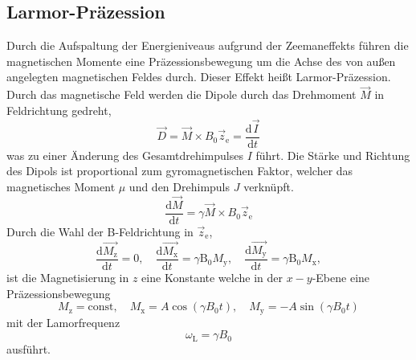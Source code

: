 \subsection{Larmor-Präzession}%
\label{sub:larmor_praezession}
Durch die Aufspaltung der Energieniveaus aufgrund der Zeemaneffekts führen
die magnetischen Momente eine Präzessionsbewegung um die Achse des von außen
angelegten magnetischen Feldes durch. 
Dieser Effekt heißt Larmor-Präzession. 
Durch das magnetische Feld werden die Dipole durch das Drehmoment $\vec{M}$ in
Feldrichtung gedreht,
\begin{equation}
		\label{eq:dreh}
		\vec{D} = \vec{M} \times B_0 \vec{z}_\text{e} = \frac{\text{d} \vec{I}}{\text{d}t} 
\end{equation}
was zu einer Änderung des Gesamtdrehimpulses $I$ führt.
Die Stärke und Richtung des Dipols ist proportional zum gyromagnetischen Faktor,
welcher das magnetisches Moment $\mu$ und den Drehimpuls $J$ verknüpft.
\begin{equation}
		\label{eq:dreh}
		\frac{\text{d} \vec{M}}{\text{d}t} = \gamma \vec{M} \times B_0
		\vec{z}_\text{e}
\end{equation}
Durch die Wahl der B-Feldrichtung in $\vec{z}_\text{e}$,
\begin{equation}
		\label{eq:ablM}
		\frac{\text{d} \vec{M_\text{z}}}{\text{d}t} = 0 ,  \hspace{1em}
		\frac{\text{d} \vec{M_\text{x}}}{\text{d}t} = \gamma \text{B}_0
		M_\text{y}, \hspace{1em}
		\frac{\text{d} \vec{M_\text{y}}}{\text{d}t} = \gamma \text{B}_0
		M_\text{x}, 
\end{equation}
 ist die Magnetisierung in $z$ eine Konstante welche in der $x-y$-Ebene
 eine Präzessionsbewegung 
\begin{equation}
		\label{eq:schwM}
		M_\text{z} = \text{const}, \hspace{1em} M_\text{x} = A \cos(\gamma B_0
		t ), \hspace{1em} M_\text{y} = -A \sin(\gamma B_0 t)
\end{equation}
mit der Lamorfrequenz
\begin{equation}
		\label{eq:larmorf}
		\omega_\text{L} = \gamma B_0
\end{equation}
ausführt. 

